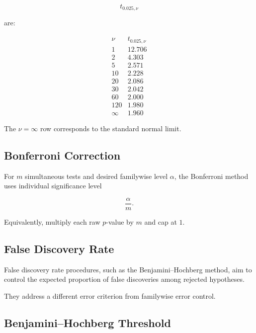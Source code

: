 \[
t_{0.025,\nu}
\]

are:

\[
\boxed{
\begin{array}{c|c}
\nu & t_{0.025,\nu} \\ \hline
1 & 12.706\\
2 & 4.303\\
5 & 2.571\\
10 & 2.228\\
20 & 2.086\\
30 & 2.042\\
60 & 2.000\\
120 & 1.980\\
\infty & 1.960
\end{array}
}
\]

The \(\nu=\infty\) row corresponds to the standard normal limit.

\subsection{Bonferroni Correction}
\label{subsec:bonferroni-reference}

For \(m\) simultaneous tests and desired familywise level \(\alpha\), the
Bonferroni method uses individual significance level

\[
\boxed{
\frac{\alpha}{m}.
}
\]

Equivalently, multiply each raw \(p\)-value by \(m\) and cap at \(1\).

\subsection{False Discovery Rate}
\label{subsec:false-discovery-rate-reference}

False discovery rate procedures, such as the Benjamini--Hochberg method, aim
to control the expected proportion of false discoveries among rejected
hypotheses.

They address a different error criterion from familywise error control.

\subsection{Benjamini--Hochberg Threshold}
\label{subsec:benjamini-hochberg-reference}

